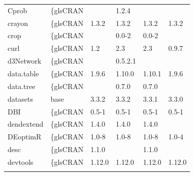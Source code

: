 \begin{longtable}{llllll}
Cprob                         & \{gls{CRAN}                      &             & 1.2.4       &                &                   \\
\rowcolor{black!5}
crayon                        & \{gls{CRAN}                      & 1.3.2       & 1.3.2       & 1.3.2          & 1.3.2              \\
\rowcolor{black!10}
crop                          & \{gls{CRAN}                      &             & 0.0-2       & 0.0-2          &                   \\
\rowcolor{black!5}
curl                          & \{gls{CRAN}                      & 1.2         & 2.3         & 2.3            & 0.9.7              \\
\rowcolor{black!10}
d3Network                     & \{gls{CRAN}                      &             & 0.5.2.1     &                &                   \\
\rowcolor{black!5}
data.table                    & \{gls{CRAN}                      & 1.9.6       & 1.10.0      & 1.10.1         & 1.9.6              \\
\rowcolor{black!10}
data.tree                     & \{gls{CRAN}                      &             & 0.7.0       & 0.7.0          &                   \\
\rowcolor{black!5}
datasets                      & base                      & 3.3.2       & 3.3.2       & 3.3.1          & 3.3.0              \\
\rowcolor{black!10}
DBI                           & \{gls{CRAN}                      & 0.5-1       & 0.5-1       & 0.5-1          & 0.5-1             \\
\rowcolor{black!5}
dendextend                    & \{gls{CRAN}                      & 1.4.0       & 1.4.0       & 1.4.0          &                    \\
\rowcolor{black!10}
DEoptimR                      & \{gls{CRAN}                      & 1.0-8       & 1.0-8       & 1.0-8          & 1.0-4             \\
\rowcolor{black!5}
desc                          & \{gls{CRAN}                      & 1.1.0       &             & 1.1.0          &                    \\
\rowcolor{black!10}
devtools                      & \{gls{CRAN}                      & 1.12.0      & 1.12.0      & 1.12.0         & 1.12.0            \\
\rowcolor{black!5}

\end{longtable}
